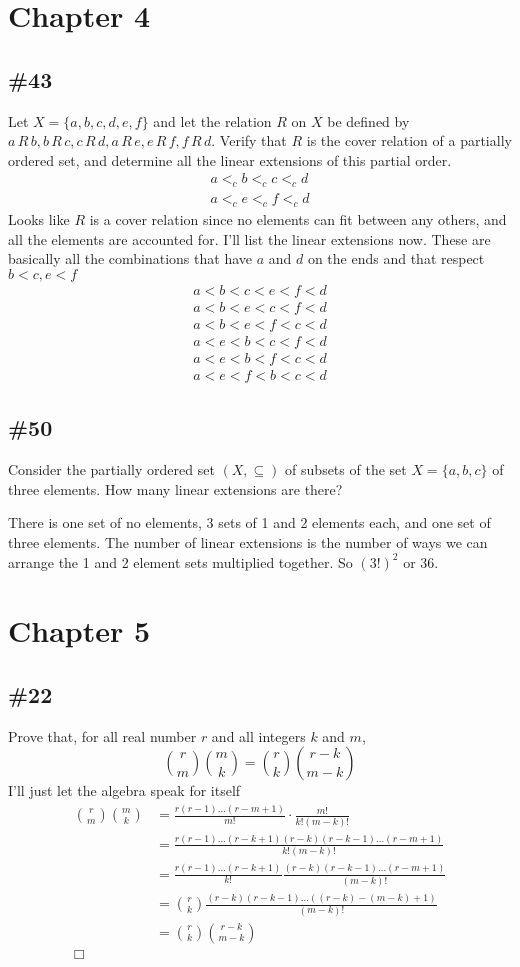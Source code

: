 \documentclass{article}
\begin{document}
\section*{Chapter 4}
\subsection*{\#43}
Let $X=\{a,b,c,d,e,f\}$ and let the relation $R$ on $X$ be defined by $a\,R\,b,b\,R\,c,c\,R\,d,a\,R\,e,e\,R\,f,f\,R\,d$. Verify that $R$ is the cover relation of a partially ordered set, and determine all the linear extensions of this partial order.
\begin{align*}
  a<_cb<_cc<_cd\\
  a<_ce<_cf<_cd
\end{align*}
Looks like $R$ is a cover relation since no elements can fit between any others, and all the elements are accounted for. I'll list the linear extensions now. These are basically all the combinations that have $a$ and $d$ on the ends and that respect $b<c, e<f$
\begin{align*}
  a<b<c<e<f<d\\
  a<b<e<c<f<d\\
  a<b<e<f<c<d\\
  a<e<b<c<f<d\\
  a<e<b<f<c<d\\
  a<e<f<b<c<d
\end{align*}
\subsection*{\#50}
Consider the partially ordered set $(X,\subseteq)$ of subsets of the set $X=\{a,b,c\}$ of three elements. How many linear extensions are there?

There is one set of no elements, 3 sets of 1 and 2 elements each, and one set of three elements. The number of linear extensions is the number of ways we can arrange the 1 and 2 element sets multiplied together. So $(3!)^2$ or 36.
\section*{Chapter 5}
\subsection*{\#22}
Prove that, for all real number $r$ and all integers $k$ and $m$,
\[\binom{r}{m}\binom{m}{k}=\binom{r}{k}\binom{r-k}{m-k}\]
I'll just let the algebra speak for itself
\begin{align*}
  \binom{r}{m}\binom{m}{k}&=\frac{r(r-1)\dots(r-m+1)}{m!}\cdot\frac{m!}{k!(m-k)!}\\
  &=\frac{r(r-1)\dots(r-k+1)(r-k)(r-k-1)\dots(r-m+1)}{k!(m-k)!}\\
  &=\frac{r(r-1)\dots(r-k+1)}{k!}\frac{(r-k)(r-k-1)\dots(r-m+1)}{(m-k)!}\\
  &=\binom{r}{k}\frac{(r-k)(r-k-1)\dots((r-k)-(m-k)+1)}{(m-k)!}\\
  &=\binom{r}{k}\binom{r-k}{m-k}\\
\Box
\end{align*}
\end{document}
